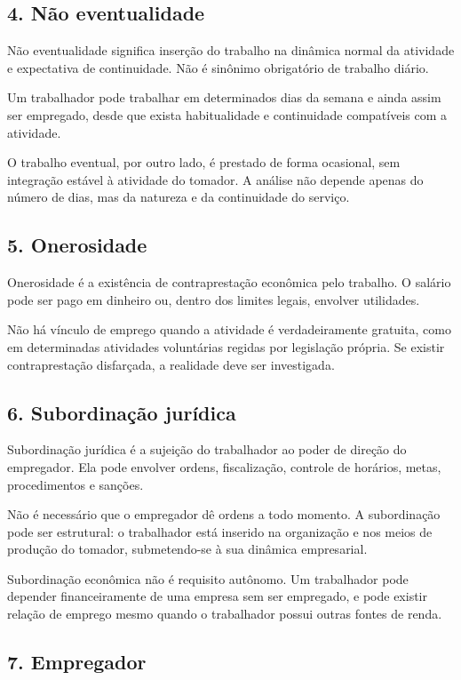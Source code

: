 \documentclass[11pt,a4paper]{article}
\begin{document}
\subsection*{4. Não eventualidade}

Não eventualidade significa inserção do trabalho na dinâmica normal da atividade e expectativa de continuidade. Não é sinônimo obrigatório de trabalho diário.

Um trabalhador pode trabalhar em determinados dias da semana e ainda assim ser empregado, desde que exista habitualidade e continuidade compatíveis com a atividade.

O trabalho eventual, por outro lado, é prestado de forma ocasional, sem integração estável à atividade do tomador. A análise não depende apenas do número de dias, mas da natureza e da continuidade do serviço.

\subsection*{5. Onerosidade}

Onerosidade é a existência de contraprestação econômica pelo trabalho. O salário pode ser pago em dinheiro ou, dentro dos limites legais, envolver utilidades.

Não há vínculo de emprego quando a atividade é verdadeiramente gratuita, como em determinadas atividades voluntárias regidas por legislação própria. Se existir contraprestação disfarçada, a realidade deve ser investigada.

\subsection*{6. Subordinação jurídica}

Subordinação jurídica é a sujeição do trabalhador ao poder de direção do empregador. Ela pode envolver ordens, fiscalização, controle de horários, metas, procedimentos e sanções.

Não é necessário que o empregador dê ordens a todo momento. A subordinação pode ser estrutural: o trabalhador está inserido na organização e nos meios de produção do tomador, submetendo-se à sua dinâmica empresarial.

Subordinação econômica não é requisito autônomo. Um trabalhador pode depender financeiramente de uma empresa sem ser empregado, e pode existir relação de emprego mesmo quando o trabalhador possui outras fontes de renda.

\subsection*{7. Empregador}
\end{document}
